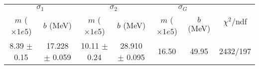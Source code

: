 \begin{tabular}{cc|cc|cc||c}
\multicolumn{2}{c|}{$\sigma_1$} & \multicolumn{2}{|c}{$\sigma_2$} & \multicolumn{2}{|c}{$\sigma_G$}  & \multirow{2}{*}{$\chi^2/$ndf}\\
$m$ ($\times1e5$) & $b$ (MeV) & $m$ ($\times1e5$) & $b$ (MeV) & $m$ ($\times1e5$) & $b$ (MeV) & \\
\hline
8.39 $\pm$ 0.15 & 17.228 $\pm$ 0.059 & 10.11 $\pm$ 0.24 & 28.910 $\pm$ 0.095 & 16.50 & 49.95 & 2432/197\\
\end{tabular}
